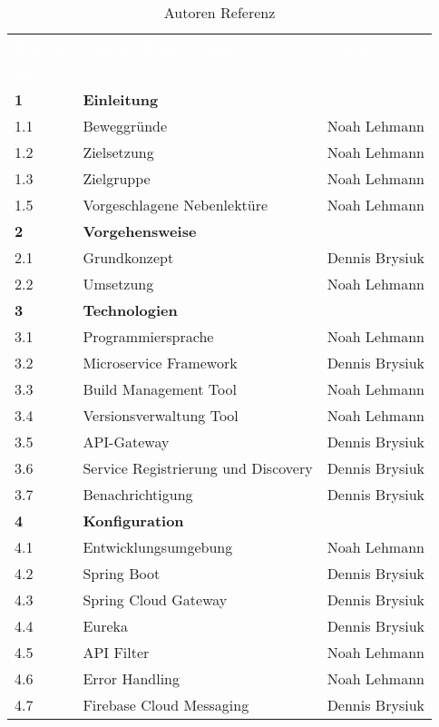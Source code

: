 \begin{table}[H]
\begin{center}
  \begin{tabular}{| l | l | l |}
 
\hline
\rowcolor{Gray}
\textcolor{white}{\textbf{Kapitel}} & \textcolor{white}{\textbf{Kapitel Bezeichnung}} & \textcolor{white}{\textbf{Autor}} \\
\rowcolor{Gray}
\textcolor{white}{\textbf{Nr.}} 	&  												  & \\  

\hline    
\rowcolor{LGray} 						
\textbf{1}		& \textbf{Einleitung}	&  				\\
\hline
1.1		& Beweggründe					& Noah Lehmann	\\
\hline
1.2		& Zielsetzung					& Noah Lehmann	\\
\hline
1.3		& Zielgruppe					& Noah Lehmann	\\
\hline
1.5		& Vorgeschlagene Nebenlektüre	& Noah Lehmann	\\

\hline    
\rowcolor{LGray} 						
\textbf{2}		& \textbf{Vorgehensweise} &  				\\
\hline
2.1		& Grundkonzept								& Dennis Brysiuk	\\
\hline
2.2		& Umsetzung									& Noah Lehmann	\\

\hline    
\rowcolor{LGray} 						
\textbf{3}	& \textbf{Technologien} &  				\\
\hline
3.1		& Programmiersprache					& Noah Lehmann	\\
\hline
3.2		& Microservice Framework				& Dennis Brysiuk\\
\hline
3.3		& Build Management Tool					& Noah Lehmann	\\
\hline
3.4		& Versionsverwaltung Tool				& Noah Lehmann	\\
\hline
3.5		& API-Gateway							& Dennis Brysiuk\\
\hline
3.6		& Service Registrierung und Discovery	& Dennis Brysiuk\\
\hline
3.7		& Benachrichtigung						& Dennis Brysiuk\\

\rowcolor{LGray} 						
\textbf{4}	& \textbf{Konfiguration} &  				\\

\hline
4.1		& Entwicklungsumgebung		& Noah Lehmann	\\
\hline
4.2		& Spring Boot				& Dennis Brysiuk	\\
\hline
4.3		& Spring Cloud Gateway		& Dennis Brysiuk	\\
\hline
4.4		& Eureka					& Dennis Brysiuk	\\
\hline
4.5		& API Filter				& Noah Lehmann	\\
\hline
4.6		& Error Handling 			& Noah Lehmann	\\
\hline
4.7		& Firebase Cloud Messaging	& Dennis Brysiuk	\\


\hline
  \end{tabular}
  \end{center}
\caption[Autoren Referenz]{Autoren Referenz}
\label{tab:autoren}
\end{table}

